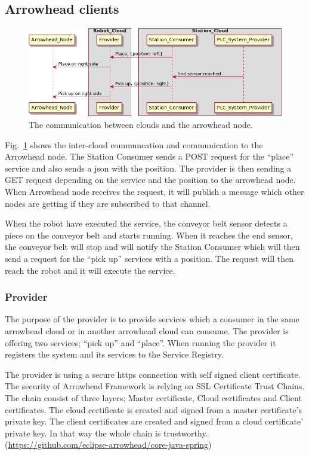 \subsection{Arrowhead clients}

\begin{figure}[h]
	\centering
	\includegraphics[width=\linewidth]{sections/assets/arrowhead_sequence_diagram.png}
	\caption{The communication between clouds and the arrowhead node.}
	\label{fig:arrowhead_intercloud}
\end{figure}

Fig.~\ref{fig:arrowhead_intercloud} shows the inter-cloud communcation and communication to the Arrowhead node.
The Station Consumer sends a POST request for the ``place'' service and also sends a json with the position.
The provider is then sending a GET request depending on the service and the position to the arrowhead node.
When Arrowhead node receives the request, it will publish a message which other nodes are getting if they are subscribed to that channel.

When the robot have executed the service, the conveyor belt sensor detects a piece on the conveyor belt and starts running.
When it reaches the end sensor, the conveyor belt will stop and will notify the Station Consumer which will then send a request for the ``pick up'' services with a position.
The request will then reach the robot and it will execute the service.

\subsubsection{Provider}
The purpose of the provider is to provide services which a consumer in the same arrowhead cloud or in another arrowhead cloud can consume. The provider is offering two services; ``pick up'' and ``place''.
When running the provider it registers the system and its services to the Service Registry.

The provider is using a secure https connection with self signed client certificate.
The security of Arrowhead Framework is relying on SSL Certificate Trust Chains.
The chain consist of three layers; Master certificate, Cloud certificates and Client certificates.
The cloud certificate is created and signed from a master certificate's private key.
The client certificates are created and signed from a cloud certificate' private key.
In that way the whole chain is trustworthy. (\url{https://github.com/eclipse-arrowhead/core-java-spring})

